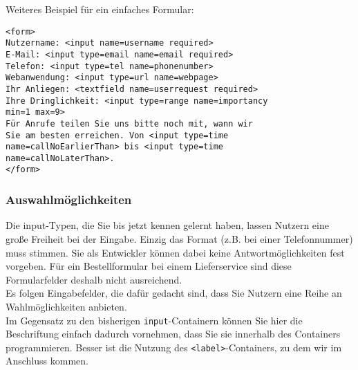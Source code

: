 Weiteres Beispiel für ein einfaches Formular:

\begin{verbatim}
<form>
Nutzername: <input name=username required>
E-Mail: <input type=email name=email required>
Telefon: <input type=tel name=phonenumber>
Webanwendung: <input type=url name=webpage>
Ihr Anliegen: <textfield name=userrequest required>
Ihre Dringlichkeit: <input type=range name=importancy 
min=1 max=9>
Für Anrufe teilen Sie uns bitte noch mit, wann wir 
Sie am besten erreichen. Von <input type=time 
name=callNoEarlierThan> bis <input type=time 
name=callNoLaterThan>.
</form>
\end{verbatim}

\subsubsection{Auswahlmöglichkeiten}

Die input-Typen, die Sie bis jetzt kennen gelernt haben, lassen Nutzern eine große Freiheit bei der Eingabe. Einzig das Format (z.B. bei einer Telefonnummer) muss stimmen. Sie als Entwickler können dabei keine Antwortmöglichkeiten fest vorgeben. Für ein Bestellformular bei einem Lieferservice sind diese Formularfelder deshalb nicht ausreichend.\\

Es folgen Eingabefelder, die dafür gedacht sind, dass Sie Nutzern eine Reihe an Wahlmöglichkeiten anbieten.\\

Im Gegensatz zu den bisherigen \verb|input|-Containern können Sie hier die Beschriftung einfach dadurch vornehmen, dass Sie sie innerhalb des Containers programmieren. Besser ist die Nutzung des \verb|<label>|-Containers, zu dem wir im Anschluss kommen.\\

